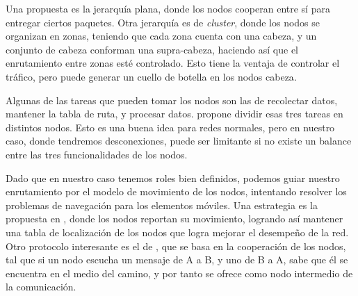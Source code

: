 \documentclass[10pt,preprint,onecolumn]{article}
\begin{document}
Una propuesta es la jerarquía plana, donde los nodos cooperan entre sí para entregar ciertos paquetes. Otra jerarquía es de \emph{cluster}, donde los nodos se organizan en zonas, teniendo que cada zona cuenta con una cabeza, y un conjunto de cabeza conforman una supra-cabeza, haciendo así que el enrutamiento entre zonas esté controlado. Esto tiene la ventaja de controlar el tráfico, pero puede generar un cuello de botella en los nodos cabeza\cite{62}.

Algunas de las tareas que pueden tomar los nodos son las de recolectar datos, mantener la tabla de ruta, y procesar datos. \cite{130} propone dividir esas tres tareas en distintos nodos. Esto es una buena idea para redes normales, pero en nuestro caso, donde tendremos desconexiones, puede ser limitante si no existe un balance entre las tres funcionalidades de los nodos.

Dado que en nuestro caso tenemos roles bien definidos, podemos guiar nuestro enrutamiento por el modelo de movimiento de los nodos, intentando resolver los problemas de navegación para los elementos móviles. Una estrategia es la propuesta en \cite{110}, donde los nodos reportan su movimiento, logrando así mantener una tabla de localización de los nodos que logra mejorar el desempeño de la red. Otro protocolo interesante es el de \cite{117}, que se basa en la cooperación de los nodos, tal que si un nodo escucha un mensaje de A a B, y uno de B a A, sabe que él se encuentra en el medio del camino, y por tanto se ofrece como nodo intermedio de la comunicación.



\end{document}
